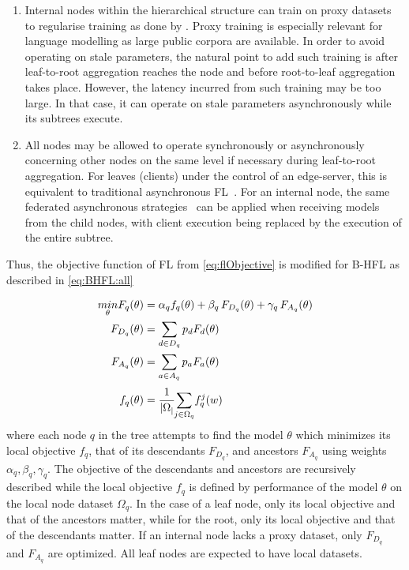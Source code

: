 \begin{enumerate}
    \item Internal nodes within the hierarchical structure can train on proxy datasets to regularise training as done by \citet{OneShotFL,FLwithNonIID}. Proxy training is especially relevant for language modelling as large public corpora are available. In order to avoid operating on stale parameters, the natural point to add such training is after leaf-to-root aggregation reaches the node and before root-to-leaf aggregation takes place. However, the latency incurred from such training may be too large. In that case, it can operate on stale parameters asynchronously while its subtrees execute.
    \item All nodes may be allowed to operate synchronously or asynchronously concerning other nodes on the same level if necessary during leaf-to-root aggregation. For leaves (clients) under the control of an edge-server, this is equivalent to traditional asynchronous FL~\citep{AsynchronousFLonHetDevicesSurvey}. For an internal node, the same federated asynchronous strategies~\citep{FedBuff,PAPAYA} can be applied when receiving models from the child nodes, with client execution being replaced by the execution of the entire subtree.
\end{enumerate}

Thus, the objective function of FL from \cref{eq:flObjective} is modified for B-HFL as described in \cref{eq:BHFL:all}

\begin{subequations}
    \begin{align}
        \underset{\theta}{min} F_q(\theta) & = \alpha_q f_q(\theta) + \beta_q \, F_{D_q}(\theta) + \gamma_q \, F_{A_q}(\theta) \\
        F_{D_q}(\theta)                    & = \sum_{d \in D_q} p_d F_d(\theta)                                                \\
        F_{A_q}(\theta)                    & = \sum_{a \in A_q} p_a F_a(\theta)                                                \\
        f_q(\theta)                        & = \cfrac{1}{\lvert \Omega_ \rvert} \underset{j \in \Omega_q}{\sum} f_q^j(w)
    \end{align}
    \label{eq:BHFL:all}
\end{subequations}
where each node $q$ in the tree attempts to find the model $\theta$ which minimizes its local objective $f_q$, that of its descendants $F_{D_q}$, and ancestors $F_{A_q}$ using weights $\alpha_q,\beta_q,\gamma_q$. The objective of the descendants and ancestors are recursively described while the local objective $f_q$ is defined by performance of the model $\theta$ on the local node dataset $\Omega_q$. In the case of a leaf node, only its local objective and that of the ancestors matter, while for the root, only its local objective and that of the descendants matter. If an internal node lacks a proxy dataset, only $F_{D_q}$ and $F_{A_q}$ are optimized. All leaf nodes are expected to have local datasets.

